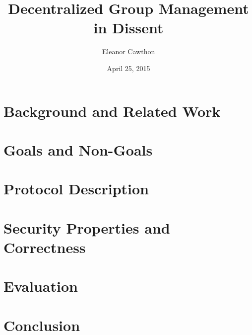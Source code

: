 \documentclass[finalcopy,nolof,nolot]{srpaper}
\title{Decentralized Group Management in Dissent}
\author{Eleanor Cawthon}
\date{April 25, 2015}
\begin{document}
\frontmatter

\preface\label{Chapter:Intro}


\chapter{Background and Related Work}\label{Chapter:Background}


\chapter{Goals and Non-Goals}\label{Chapter:Security}


\chapter{Protocol Description}\label{Chapter:Protocol}


\chapter{Security Properties and Correctness}\label{Chapter:Proofs}

\chapter{Evaluation}\label{Chapter:Evaluation}

\chapter{Conclusion}\label{Chapter:Conclusion}


\end{document}
